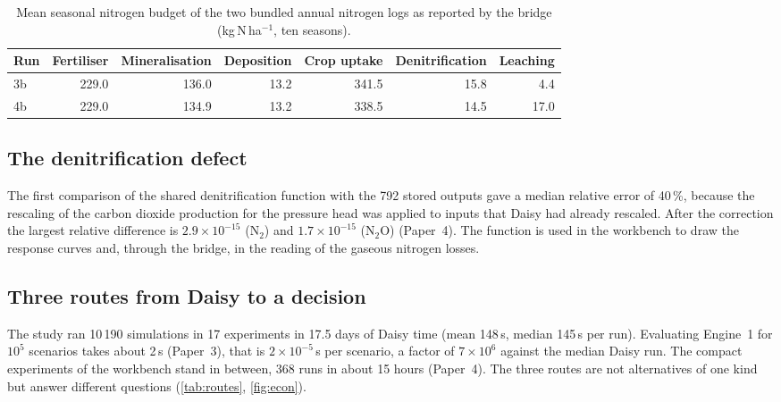 \begin{table}[H]\centering\small
\caption{Mean seasonal nitrogen budget of the two bundled annual nitrogen logs as reported by the bridge (kg\,N\,ha$^{-1}$, ten seasons).}\label{tab:nrun}
\begin{tabular}{lrrrrrr}\toprule
Run & Fertiliser & Mineralisation & Deposition & Crop uptake & Denitrification & Leaching\\\midrule
3b & 229.0 & 136.0 & 13.2 & 341.5 & 15.8 & 4.4\\
4b & 229.0 & 134.9 & 13.2 & 338.5 & 14.5 & 17.0\\\bottomrule
\end{tabular}
\end{table}

\subsection{The denitrification defect}
The first comparison of the shared denitrification function with the 792 stored outputs gave a median relative error of 40\,\%, because the rescaling of the carbon dioxide production for the pressure head was applied to inputs that Daisy had already rescaled. After the correction the largest relative difference is $2.9\times10^{-15}$ (N$_2$) and $1.7\times10^{-15}$ (N$_2$O) (Paper~4). The function is used in the workbench to draw the response curves and, through the bridge, in the reading of the gaseous nitrogen losses.

\subsection{Three routes from Daisy to a decision}
The study ran 10\,190 simulations in 17 experiments in 17.5 days of Daisy time (mean 148\,s, median 145\,s per run). Evaluating Engine~1 for $10^5$ scenarios takes about 2\,s (Paper~3), that is $2\times10^{-5}$\,s per scenario, a factor of $7\times10^{6}$ against the median Daisy run. The compact experiments of the workbench stand in between, 368 runs in about 15 hours (Paper~4). The three routes are not alternatives of one kind but answer different questions (\cref{tab:routes}, \cref{fig:econ}).

